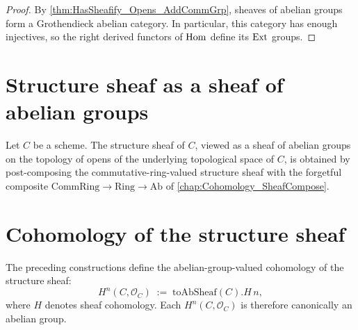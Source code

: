 \begin{proof}


\leanok
  By \cref{thm:HasSheafify_Opens_AddCommGrp}, sheaves of abelian groups form a Grothendieck abelian category. In particular, this category has enough injectives, so the right derived functors of \(\operatorname{Hom}\) define its \(\operatorname{Ext}\) groups.
\end{proof}

\section{Structure sheaf as a sheaf of abelian groups}

\begin{definition}\leanok
  \label{def:Scheme_toAbSheaf}

  Let \(C\) be a scheme. The structure sheaf of \(C\), viewed as a sheaf of abelian groups on the topology of opens of the underlying topological space of \(C\), is obtained by post-composing the commutative-ring-valued structure sheaf with the forgetful composite \(\mathrm{CommRing} \to \mathrm{Ring} \to \mathrm{Ab}\) of \cref{chap:Cohomology_SheafCompose}.
\end{definition}

\section{Cohomology of the structure sheaf}

The preceding constructions define the abelian-group-valued cohomology of the structure sheaf:
\[
  H^n(C, \mathcal O_C) \;:=\; \text{toAbSheaf}(C).H\,n,
\]
where \(H\) denotes sheaf cohomology. Each \(H^n(C, \mathcal O_C)\) is therefore canonically an abelian group.
